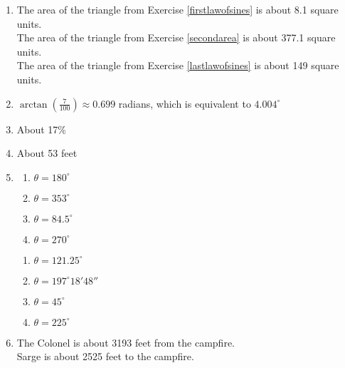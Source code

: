 \documentclass{ximera}
\begin{document}
\begin{enumerate}

\setcounter{enumi}{\value{HW}}

\item The area of the triangle from Exercise \ref{firstlawofsines} is about 8.1 square units.\\
The area of the triangle from Exercise \ref{secondarea} is about 377.1 square units.\\
The area of the triangle from Exercise \ref{lastlawofsines} is about 149 square units.

\item $\arctan\left(\frac{7}{100}\right) \approx 0.699$ radians, which is equivalent to $4.004^{\circ}$
\item About 17\%
\item About 53 feet

\pagebreak

\item \begin{multicols}{4} \begin{enumerate}

\item $\theta = 180^{\circ}$
\item $\theta = 353^{\circ}$
\item $\theta = 84.5^{\circ}$
\item $\theta = 270^{\circ}$

\setcounter{HWindent}{\value{enumii}}

\end{enumerate}

\end{multicols}

\begin{multicols}{4} 

\begin{enumerate}

\setcounter{enumii}{\value{HWindent}}

\item $\theta = 121.25^{\circ}$
\item $\theta = 197^{\circ} 18' 48''$
\item $\theta = 45^{\circ}$
\item $\theta = 225^{\circ}$

\end{enumerate}

\end{multicols}

\item  The Colonel is about 3193 feet from the campfire. \\
Sarge is about 2525 feet to the campfire.


\end{enumerate}
\end{document}
